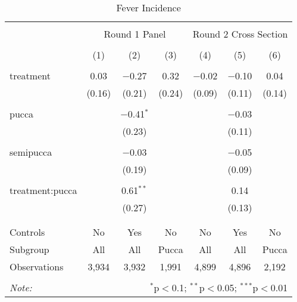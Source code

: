 
\begin{table}[!htbp] \centering 
  \caption{Fever Incidence} 
  \label{tbl:Fever Incidence} 
\begin{tabular}{@{\extracolsep{5pt}}lcccccc} 
\\[-1.8ex]\hline 
\hline \\[-1.8ex] 
 & \multicolumn{3}{c}{Round 1 Panel} & \multicolumn{3}{c}{Round 2 Cross Section} \\ 
\\[-1.8ex] & (1) & (2) & (3) & (4) & (5) & (6)\\ 
\hline \\[-1.8ex] 
 treatment & 0.03 & $-$0.27 & 0.32 & $-$0.02 & $-$0.10 & 0.04 \\ 
  & (0.16) & (0.21) & (0.24) & (0.09) & (0.11) & (0.14) \\ 
  & & & & & & \\ 
 pucca &  & $-$0.41$^{*}$ &  &  & $-$0.03 &  \\ 
  &  & (0.23) &  &  & (0.11) &  \\ 
  & & & & & & \\ 
 semipucca &  & $-$0.03 &  &  & $-$0.05 &  \\ 
  &  & (0.19) &  &  & (0.09) &  \\ 
  & & & & & & \\ 
 treatment:pucca &  & 0.61$^{**}$ &  &  & 0.14 &  \\ 
  &  & (0.27) &  &  & (0.13) &  \\ 
  & & & & & & \\ 
\hline \\[-1.8ex] 
Controls & No & Yes & No & No & Yes & No \\ 
Subgroup & All & All & Pucca & All & All & Pucca \\ 
Observations & 3,934 & 3,932 & 1,991 & 4,899 & 4,896 & 2,192 \\ 
\hline 
\hline \\[-1.8ex] 
\textit{Note:}  & \multicolumn{6}{r}{$^{*}$p$<$0.1; $^{**}$p$<$0.05; $^{***}$p$<$0.01} \\ 
\end{tabular} 
\end{table} 
